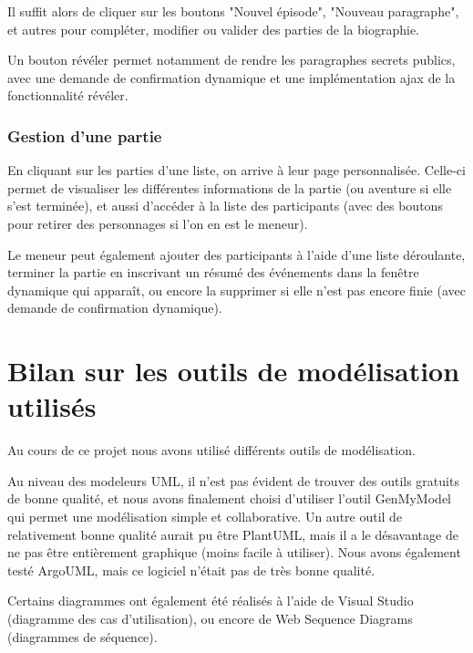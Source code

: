 \documentclass[a4paper, 11pt, titlepage]{article}
\begin{document}
Il suffit alors de cliquer sur les boutons "Nouvel épisode", "Nouveau paragraphe", et autres pour compléter, modifier ou valider des parties de la biographie.

Un bouton révéler permet notamment de rendre les paragraphes secrets publics, avec une demande de confirmation dynamique et une implémentation {\sc ajax} de la fonctionnalité révéler.


\subsubsection {Gestion d'une partie}

En cliquant sur les parties d'une liste, on arrive à leur page personnalisée. Celle-ci permet de visualiser les différentes informations de la partie (ou aventure si elle s'est terminée), et aussi d'accéder à la liste des participants (avec des boutons pour retirer des personnages si l'on en est le meneur).

Le meneur peut également ajouter des participants à l'aide d'une liste déroulante, terminer la partie en inscrivant un résumé des événements dans la fenêtre dynamique qui apparaît, ou encore la supprimer si elle n'est pas encore finie (avec demande de confirmation dynamique).







\section {Bilan sur les outils de modélisation utilisés}

Au cours de ce projet nous avons utilisé différents outils de modélisation.

Au niveau des modeleurs UML, il n'est pas évident de trouver des outils gratuits de bonne qualité, et nous avons finalement choisi d'utiliser l'outil GenMyModel qui permet une modélisation simple et collaborative. Un autre outil de relativement bonne qualité aurait pu être PlantUML, mais il a le désavantage de ne pas être entièrement graphique (moins facile à utiliser). Nous avons également testé ArgoUML, mais ce logiciel n'était pas de très bonne qualité.

Certains diagrammes ont également été réalisés à l'aide de Visual Studio (diagramme des cas d'utilisation), ou encore de Web Sequence Diagrams (diagrammes de séquence).
\end{document}
